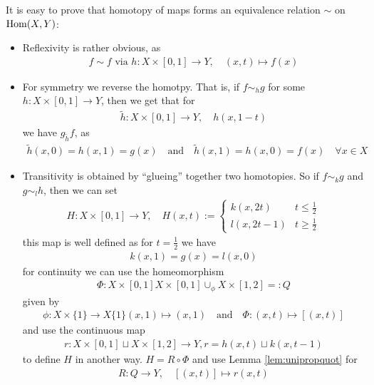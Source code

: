 \begin{rem}[]
  It is easy to prove that homotopy of maps forms an equivalence relation $\sim$ on $\operatorname{Hom}(X,Y)$:
  \begin{itemize}
    \item 
      Reflexivity is rather obvious, as
      \begin{align*}
        f \sim f \text{ via } h: X \times [0,1] \to Y, \quad (x,t) \mapsto f(x)
      \end{align*}
    \item For symmetry we reverse the homotpy. That is, if $f \sim_h g$ for some $h: X \times[0,1] \to Y$, then we get that for
      \begin{align*}
        \tilde{h}: X \times [0,1] \to  Y, \quad h(x,1-t)
      \end{align*}
      we have $g_{\tilde{h}}f$, as
      \begin{align*}
        \tilde{h}(x,0) = h(x,1) = g(x) \quad \text{and} \quad \tilde{h}(x,1) = h(x,0) = f(x) \quad \forall x \in X
      \end{align*}
    \item Transitivity is obtained by ``glueing'' together two homotopies.
      So if $f \sim_k g$ and $g \sim_l h$, then we can set
      \begin{align*}
        H: X \times [0,1] \to Y, \quad H(x,t) := \left\{\begin{array}{ll}
            k(x,2t) & t \leq \tfrac{1}{2}\\
            l(x,2t -1)& t \geq \tfrac{1}{2}
        \end{array} \right.
      \end{align*}
      this map is well defined as for $t = \tfrac{1}{2}$ we have
      \begin{align*}
        k(x,1) = g(x) = l(x,0)
      \end{align*}
      for continuity we can use the homeomorphism
      \begin{align*}
        \Phi: X \times [0,1] X \times[0,1] \cup_{\phi} X \times [1,2] =: Q
      \end{align*}
      given by
      \begin{align*}
        \phi: X \times \{1\} \to  X \{1\} (x,1) \mapsto (x,1) \quad \text{and} \quad \Phi: (x,t) \mapsto [(x,t)]
      \end{align*}
      and use the continuous map
      \begin{align*}
        r: X \times [0,1] \sqcup X \times [1,2] \to Y, r = h(x,t) \sqcup k(x,t-1)
      \end{align*}
      to define $H$ in another way. $H = R \circ \Phi$ and use Lemma \ref{lem:unipropquot} for
      \begin{align*}
        R: Q \to  Y, \quad [(x,t)] \mapsto r(x,t)
      \end{align*}
  \end{itemize}
\end{rem}

